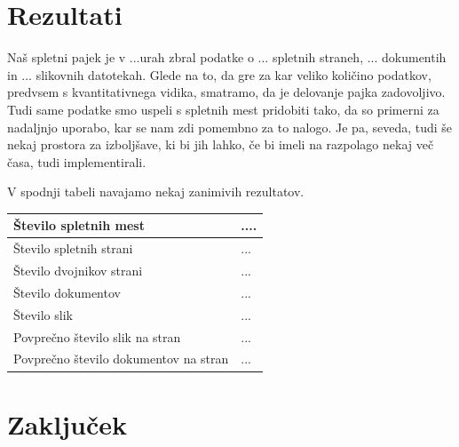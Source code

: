\documentclass[conference]{IEEEtran}
\begin{document}
	\section{Rezultati}
	Naš spletni pajek je v ...urah zbral podatke o ... spletnih straneh, ... dokumentih in ... slikovnih datotekah. Glede na to, da gre za kar veliko količino podatkov, predvsem s kvantitativnega vidika, smatramo, da je delovanje pajka zadovoljivo. Tudi same podatke smo uspeli s spletnih mest pridobiti tako, da so primerni za nadaljnjo uporabo, kar se nam zdi pomembno za to nalogo. Je pa, seveda, tudi še nekaj prostora za izboljšave, ki bi jih lahko, če bi imeli na razpolago nekaj več časa, tudi implementirali.
	
	V spodnji tabeli navajamo nekaj zanimivih rezultatov.

\begin{flushleft}
\begin{tabular}{ |l|l| } 
 \hline
 Število spletnih mest & ....  \\ 
 \hline
 Število spletnih strani & ...  \\  
 \hline
 Število dvojnikov strani & ... \\
 \hline
 Število dokumentov & ... \\
 \hline
 Število slik & ... \\
 \hline
 Povprečno število slik na stran & ... \\
 \hline
 Povprečno število dokumentov na stran & ... \\
 \hline
\end{tabular}
\end{flushleft}


	
	
	
	\section{Zaključek}
	
	
	
	
\end{document}
